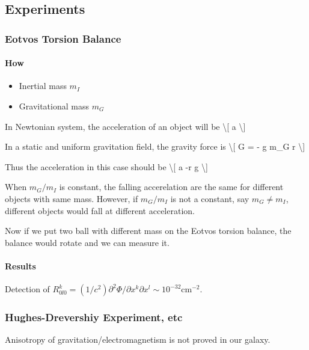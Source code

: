 \documentclass[letterpaper,10pt,english]{sphinxmanual}
\begin{document}
\subsection{Experiments}
\label{relativity/GeneralRelativityAdv:experiments}

\subsubsection{Eotvos Torsion Balance}
\label{relativity/GeneralRelativityAdv:eotvos-torsion-balance}

\paragraph{How}
\label{relativity/GeneralRelativityAdv:how}\begin{itemize}
\item {} 
Inertial mass \(m_I\)

\item {} 
Gravitational mass \(m_G\)

\end{itemize}

In Newtonian system, the acceleration of an object will be \textbackslash{}{[} a \textbackslash{}{]}

In a static and uniform gravitation field, the gravity force is \textbackslash{}{[} G =
- g m\_G r \textbackslash{}{]}

Thus the acceleration in this case should be \textbackslash{}{[} a -r g \textbackslash{}{]}

When \(m_G/m_I\) is constant, the falling accerelation are the same
for different objects with same mass. However, if \(m_G/m_I\) is not
a constant, say \(m_G\ne m_I\), different objects would fall at
different acceleration.

Now if we put two ball with different mass on the Eotvos torsion
balance, the balance would rotate and we can measure it.


\paragraph{Results}
\label{relativity/GeneralRelativityAdv:results}
Detection of
\(R^k_{0l0}=(1/c^2)\partial^2\Phi/\partial x^k\partial x^l \sim 10^{-32} \text{cm}^{-2}\).


\subsubsection{Hughes-Drevershiy Experiment, etc}
\label{relativity/GeneralRelativityAdv:hughes-drevershiy-experiment-etc}
Anisotropy of gravitation/electromagnetism is not proved in our galaxy.
\end{document}
